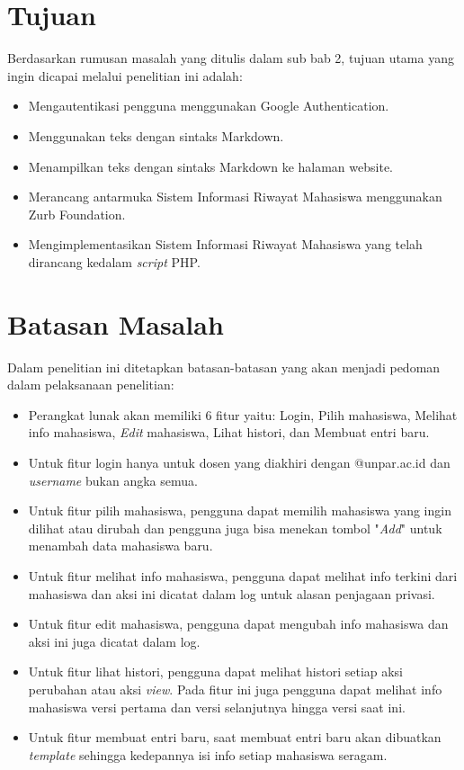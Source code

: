 \section{Tujuan}
Berdasarkan rumusan masalah yang ditulis dalam sub bab 2, tujuan utama yang
ingin dicapai melalui penelitian ini adalah:
\begin{itemize}
	\item Mengautentikasi pengguna menggunakan Google Authentication.
	\item Menggunakan teks dengan sintaks Markdown.
	\item Menampilkan teks dengan sintaks Markdown ke halaman website.
	\item Merancang antarmuka Sistem Informasi Riwayat Mahasiswa menggunakan Zurb
	Foundation.
	\item Mengimplementasikan Sistem Informasi Riwayat Mahasiswa yang telah
	dirancang kedalam {\it script} PHP.
\end{itemize}

\section{Batasan Masalah}
Dalam penelitian ini ditetapkan batasan-batasan yang akan menjadi pedoman dalam
pelaksanaan penelitian:
\begin{itemize}
	\item Perangkat lunak akan memiliki 6 fitur yaitu: Login, Pilih mahasiswa,
	Melihat info mahasiswa, {\it Edit} mahasiswa, Lihat histori, dan Membuat entri
	baru.
	\item Untuk fitur login hanya untuk dosen yang diakhiri dengan @unpar.ac.id dan
	{\it username} bukan angka semua.
	\item Untuk fitur pilih mahasiswa, pengguna dapat memilih mahasiswa yang ingin
	dilihat atau dirubah dan pengguna juga bisa menekan tombol "{\it Add}" untuk
	menambah data mahasiswa baru.
	\item Untuk fitur melihat info mahasiswa, pengguna dapat melihat info terkini
	dari mahasiswa dan aksi ini dicatat dalam log untuk alasan penjagaan privasi.
	\item Untuk fitur edit mahasiswa, pengguna dapat mengubah info mahasiswa dan
	aksi ini juga dicatat dalam log.
	\item Untuk fitur lihat histori, pengguna dapat melihat histori setiap aksi
	perubahan atau aksi {\it view}. Pada fitur ini juga pengguna dapat melihat info
	mahasiswa versi pertama dan versi selanjutnya hingga versi saat ini.
	\item Untuk fitur membuat entri baru, saat membuat entri baru akan dibuatkan
	{\it template} sehingga kedepannya isi info setiap mahasiswa seragam.
\end{itemize}


